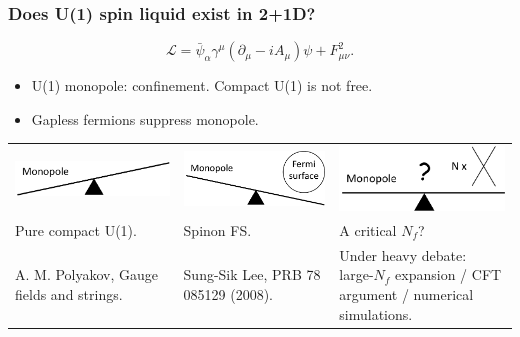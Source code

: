 \documentclass[xcolor=table, 10pt, aspectratio=169]{beamer}
\begin{document}
\begin{frame}
	\frametitle{Does U(1) spin liquid exist in 2+1D?}
	\[\mathcal L = \bar\psi_\alpha \gamma^\mu(\partial_\mu-iA_\mu)\psi + F_{\mu\nu}^2.\]
	\begin{itemize}
		\item U(1) monopole: confinement. Compact U(1) is \alert{not free}.
		\item Gapless fermions suppress monopole.
	\end{itemize}
	\begin{tabular}{p{}p{}p{}}
		\includegraphics[scale=.45]{balance1}
		&
		\includegraphics[scale=.45]{balance2}
		&
		\includegraphics[scale=.45]{balance3}\\
		Pure compact U(1). & Spinon FS. & A critical $N_f$?\\
		A. M. Polyakov, Gauge fields and strings. & Sung-Sik Lee, PRB 78 085129 (2008). & Under heavy debate: large-$N_f$ expansion / CFT argument / numerical simulations.
	\end{tabular}
\end{frame}
\end{document}
